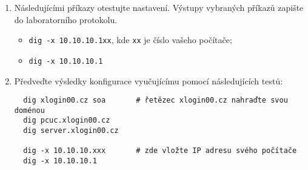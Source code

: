 \documentclass[a4paper,11pt]{article}
\begin{document}
\begin{enumerate}
    \item Následujícími příkazy otestujte nastavení. Výstupy vybraných příkazů zapište do laboratorního protokolu. 
    \begin{itemize}
        \item {\tt dig -x 10.10.10.1xx}, kde {\tt xx} je číslo vašeho počítače;
        \item {\tt dig -x 10.10.10.1}
    \end{itemize}

  \item Předveďte výsledky konfigurace vyučujícímu pomocí následujících testů:
\begin{verbatim}
  dig xlogin00.cz soa       # řetězec xlogin00.cz nahraďte svou doménou
  dig pcuc.xlogin00.cz
  dig server.xlogin00.cz

  dig -x 10.10.10.xxx       # zde vložte IP adresu svého počítače
  dig -x 10.10.10.1
\end{verbatim}



\end{enumerate}
\end{document}

